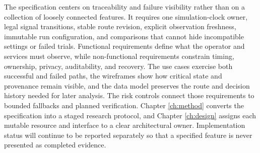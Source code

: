 The specification centers on traceability and failure visibility rather than on a collection of loosely connected features. It requires one simulation-clock owner, legal signal transitions, stable route revision, explicit observation freshness, immutable run configuration, and comparisons that cannot hide incompatible settings or failed trials. Functional requirements define what the operator and services must observe, while non-functional requirements constrain timing, ownership, privacy, auditability, and recovery. The use cases exercise both successful and failed paths, the wireframes show how critical state and provenance remain visible, and the data model preserves the route and decision history needed for later analysis. The risk controls connect those requirements to bounded fallbacks and planned verification. Chapter \ref{ch:method} converts the specification into a staged research protocol, and Chapter \ref{ch:design} assigns each mutable resource and interface to a clear architectural owner. Implementation status will continue to be reported separately so that a specified feature is never presented as completed evidence.
